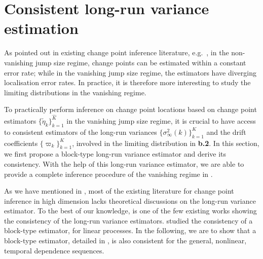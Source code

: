 \documentclass[11pt]{article}
\theoremstyle{plain}
\theoremstyle{definition}
\begin{document}
\section{Consistent long-run variance estimation}\label{sec:LRV}

As pointed out in existing change point inference literature, e.g.\ \cite{bai2010common}, in the non-vanishing jump size regime, change points can be estimated within a constant error rate; while in the vanishing jump size regime, the estimators have diverging localisation error rates.  In practice, it is therefore more interesting to study the limiting distributions in the vanishing regime.

To practically perform inference on change point locations based on change point estimators $\{\widetilde{\eta}_k\}_{k = 1}^{\widehat{K}}$ in the vanishing jump size regime, it is crucial to have access to consistent estimators of the long-run variances $\{\sigma^2_{\infty}(k)\}_{k = 1}^K$ and the drift coefficients $\{\varpi_k\}_{k = 1}^K$, involved in the limiting distribution in \textbf{b.2}.  In this section, we first propose a block-type long-run variance estimator and derive its consistency. With the help of this long-run variance estimator, we are able to provide a complete inference procedure of the vanishing regime in .   
  
As we have mentioned in , most of the existing literature for change point inference in high dimension lacks theoretical discussions on the long-run variance estimator.  To the best of our knowledge, \cite{chen2021inference} is one of the few existing works showing the consistency of the long-run variance estimators.  \cite{chen2021inference} studied the consistency of a block-type estimator, for linear processes.  In the following, we are to show that a block-type estimator, detailed in , is also consistent for the general, nonlinear, temporal dependence sequences.  
\end{document}
